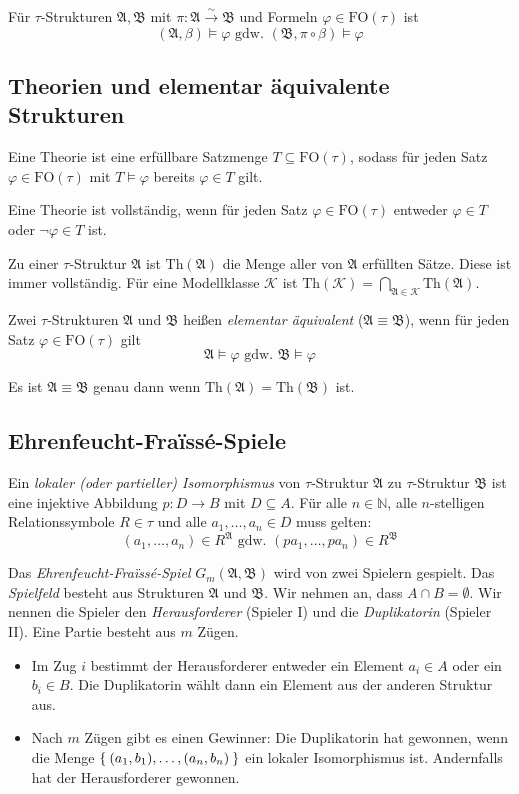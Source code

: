 \documentclass[a4paper,parskip=half*,DIV=15,fontsize=11pt]{scrartcl}
\newcommand{\A}{\mathfrak{A}}
\newcommand{\B}{\mathfrak{B}}
\newcommand{\FO}{\mathrm{FO}}
\newcommand{\isoTo}{\overset{\sim}{\to}}
\newcommand{\Th}{\mathrm{Th}}
\newcommand{\K}{\mathcal{K}}
\begin{document}
Für $\tau$-Strukturen $\A, \B$ mit $\pi : \A \isoTo \B$ und Formeln $\varphi \in \FO(\tau)$ ist
\[(\A, \beta) \models \varphi \text{ gdw.\ } (\B, \pi \circ \beta) \models \varphi\]

\subsection{Theorien und elementar äquivalente Strukturen}

Eine Theorie ist eine erfüllbare Satzmenge $T \subseteq \FO(\tau)$, sodass für jeden Satz $\varphi \in \FO(\tau)$ mit $T \models \varphi$ bereits $\varphi \in T$ gilt.

Eine Theorie ist vollständig, wenn für jeden Satz $\varphi \in \FO(\tau)$ entweder $\varphi \in T$ oder $\neg \varphi \in T$ ist.

Zu einer $\tau$-Struktur $\A$ ist $\Th(\A)$ die Menge aller von $\A$ erfüllten Sätze. Diese ist immer vollständig.
Für eine Modellklasse $\K$ ist $\Th(\K) = \bigcap_{\A \in \K} \Th(\A)$.

Zwei $\tau$-Strukturen $\A$ und $\B$ heißen \emph{elementar äquivalent} ($\A \equiv \B$), wenn für jeden Satz $\varphi \in \FO(\tau)$ gilt
\[\A \models \varphi \text{ gdw. } \B \models \varphi\]

Es ist $\A \equiv \B$ genau dann wenn $\Th(\A) = \Th(\B)$ ist.

\subsection{Ehrenfeucht-Fra\"issé-Spiele}

Ein \emph{lokaler (oder partieller) Isomorphismus} von $\tau$-Struktur $\A$ zu $\tau$-Struktur $\B$ ist eine injektive Abbildung $p : D \to B$ mit $D \subseteq A$. Für alle $n \in \mathbb{N}$, alle $n$-stelligen Relationssymbole $R \in \tau$ und alle $a_1, \ldots, a_n \in D$ muss gelten:
\[ (a_1, \ldots, a_n) \in R^\A \text{ gdw. } (p a_1, \ldots, p a_n) \in R^\B \]

Das \emph{Ehrenfeucht-Fra\"issé-Spiel} $G_m(\A, \B)$ wird von zwei Spielern gespielt. Das \emph{Spielfeld} besteht aus Strukturen $\A$ und $\B$. Wir nehmen an, dass $A \cap B = \emptyset$. Wir nennen die Spieler den \emph{Herausforderer} (Spieler I) und die \emph{Duplikatorin} (Spieler II). Eine Partie besteht aus $m$ Zügen.

\begin{itemize}
  \item Im Zug $i$ bestimmt der Herausforderer entweder ein Element $a_i \in A$ oder ein $b_i \in B$. Die Duplikatorin wählt dann ein Element aus der anderen Struktur aus.
  \item Nach $m$ Zügen gibt es einen Gewinner: Die Duplikatorin hat gewonnen, wenn die Menge $\Set{(a_1, b_1), \ldots,  (a_n, b_n)}$ ein lokaler Isomorphismus ist. Andernfalls hat der Herausforderer gewonnen.
\end{itemize}
\end{document}
